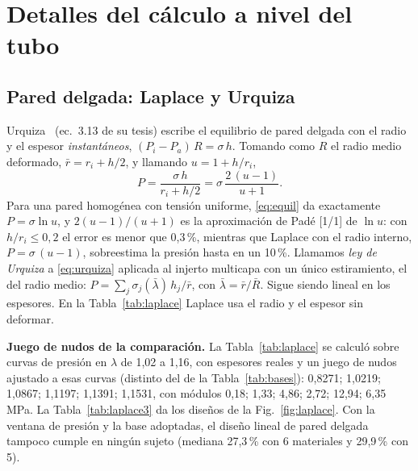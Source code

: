 \clearpage
\section{Detalles del cálculo a nivel del tubo}\label{sec:calculo}
\subsection{Pared delgada: Laplace y Urquiza}
Urquiza~\cite{urquiza} (ec.~3.13 de su tesis) escribe el equilibrio de pared delgada con el radio y el espesor \emph{instantáneos}, $(P_i-P_a)\,R=\sigma\,h$. Tomando como $R$ el radio medio deformado, $\bar r=r_i+h/2$, y llamando $u=1+h/r_i$,
\begin{equation}\label{eq:urquiza}
P=\frac{\sigma\,h}{r_i+h/2}=\sigma\,\frac{2\,(u-1)}{u+1}.
\end{equation}
Para una pared homogénea con tensión uniforme, \eqref{eq:equil} da exactamente $P=\sigma\ln u$, y $2(u-1)/(u+1)$ es la aproximación de Padé [1/1] de $\ln u$: con $h/r_i\le0{,}2$ el error es menor que 0,3\,\%, mientras que Laplace con el radio interno, $P=\sigma\,(u-1)$, sobreestima la presión hasta en un 10\,\%. Llamamos \emph{ley de Urquiza} a \eqref{eq:urquiza} aplicada al injerto multicapa con un único estiramiento, el del radio medio: $P=\sum_j\sigma_j(\bar\lambda)\,h_j/\bar r$, con $\bar\lambda=\bar r/\bar R$. Sigue siendo lineal en los espesores. En la Tabla~\ref{tab:laplace} Laplace usa el radio y el espesor sin deformar.

\textbf{Juego de nudos de la comparación.} La Tabla~\ref{tab:laplace} se calculó sobre curvas de presión en $\lambda$ de 1,02 a 1,16, con espesores reales y un juego de nudos ajustado a esas curvas (distinto del de la Tabla~\ref{tab:bases}): 0,8271; 1,0219; 1,0867; 1,1197; 1,1391; 1,1531, con módulos 0,18; 1,33; 4,86; 2,72; 12,94; 6,35\,MPa. La Tabla~\ref{tab:laplace3} da los diseños de la Fig.~\ref{fig:laplace}. Con la ventana de presión y la base adoptadas, el diseño lineal de pared delgada tampoco cumple en ningún sujeto (mediana 27,3\,\% con 6 materiales y 29,9\,\% con 5).

